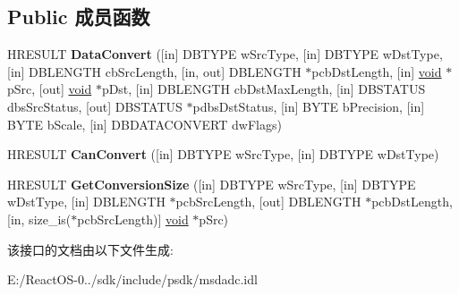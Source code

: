 \subsection*{Public 成员函数}
\begin{DoxyCompactItemize}
\item 
\mbox{\label{interface_i_data_convert_ad834c40d388a6f807eef3b4adafb7f49}} 
H\+R\+E\+S\+U\+LT {\bfseries Data\+Convert} (\mbox{[}in\mbox{]} D\+B\+T\+Y\+PE w\+Src\+Type, \mbox{[}in\mbox{]} D\+B\+T\+Y\+PE w\+Dst\+Type, \mbox{[}in\mbox{]} D\+B\+L\+E\+N\+G\+TH cb\+Src\+Length, \mbox{[}in, out\mbox{]} D\+B\+L\+E\+N\+G\+TH $\ast$pcb\+Dst\+Length, \mbox{[}in\mbox{]} \hyperlink{interfacevoid}{void} $\ast$p\+Src, \mbox{[}out\mbox{]} \hyperlink{interfacevoid}{void} $\ast$p\+Dst, \mbox{[}in\mbox{]} D\+B\+L\+E\+N\+G\+TH cb\+Dst\+Max\+Length, \mbox{[}in\mbox{]} D\+B\+S\+T\+A\+T\+US dbs\+Src\+Status, \mbox{[}out\mbox{]} D\+B\+S\+T\+A\+T\+US $\ast$pdbs\+Dst\+Status, \mbox{[}in\mbox{]} B\+Y\+TE b\+Precision, \mbox{[}in\mbox{]} B\+Y\+TE b\+Scale, \mbox{[}in\mbox{]} D\+B\+D\+A\+T\+A\+C\+O\+N\+V\+E\+RT dw\+Flags)
\item 
\mbox{\label{interface_i_data_convert_a9de6b4122dd0283c0cb7eef78b2f2b1d}} 
H\+R\+E\+S\+U\+LT {\bfseries Can\+Convert} (\mbox{[}in\mbox{]} D\+B\+T\+Y\+PE w\+Src\+Type, \mbox{[}in\mbox{]} D\+B\+T\+Y\+PE w\+Dst\+Type)
\item 
\mbox{\label{interface_i_data_convert_ac0249a30c2f59ea5c5a657ecf618fc73}} 
H\+R\+E\+S\+U\+LT {\bfseries Get\+Conversion\+Size} (\mbox{[}in\mbox{]} D\+B\+T\+Y\+PE w\+Src\+Type, \mbox{[}in\mbox{]} D\+B\+T\+Y\+PE w\+Dst\+Type, \mbox{[}in\mbox{]} D\+B\+L\+E\+N\+G\+TH $\ast$pcb\+Src\+Length, \mbox{[}out\mbox{]} D\+B\+L\+E\+N\+G\+TH $\ast$pcb\+Dst\+Length, \mbox{[}in, size\+\_\+is($\ast$pcb\+Src\+Length)\mbox{]} \hyperlink{interfacevoid}{void} $\ast$p\+Src)
\end{DoxyCompactItemize}


该接口的文档由以下文件生成\+:\begin{DoxyCompactItemize}
\item 
E\+:/\+React\+O\+S-\/0../sdk/include/psdk/msdadc.\+idl\end{DoxyCompactItemize}
